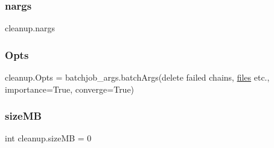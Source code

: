 \subsubsection{\texorpdfstring{nargs}{nargs}}
{\footnotesize\ttfamily cleanup.\+nargs}

\mbox{\label{namespacecleanup_aa1b081b2901070b9152c5dd5f7f25fde}} 
\subsubsection{\texorpdfstring{Opts}{Opts}}
{\footnotesize\ttfamily cleanup.\+Opts = batchjob\+\_\+args.\+batch\+Args(\textquotesingle{}delete failed chains, \mbox{\hyperlink{namespacecleanup_a34b52e3d1be71a09b7fbfb3006ea52b0}{files}} etc.\textquotesingle{}, importance=True, converge=True)}

\mbox{\label{namespacecleanup_a80579ad67858e587e6c83e9db7b8eb18}} 
\subsubsection{\texorpdfstring{size\+MB}{sizeMB}}
{\footnotesize\ttfamily int cleanup.\+size\+MB = 0}

